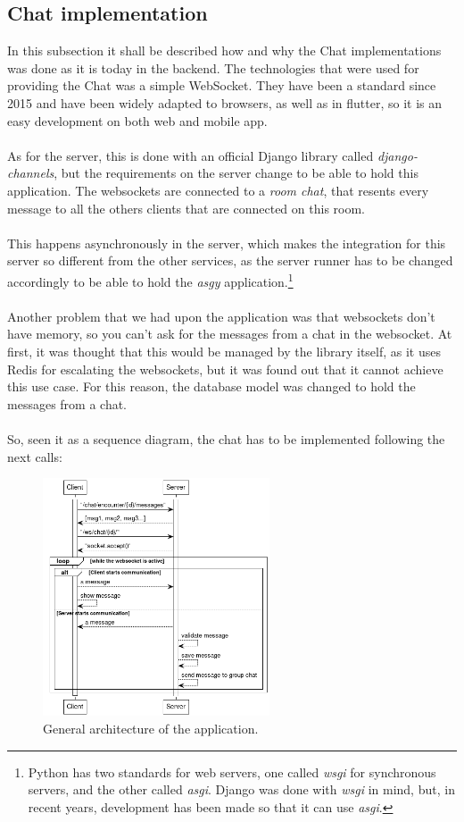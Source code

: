 \documentclass[./main.tex]{subfiles}
\begin{document}
	 \subsection{Chat implementation}
	 In this subsection it shall be described how and why the Chat implementations was done as it
	 is today in the backend. The technologies that were used for providing the Chat was a simple 
	 WebSocket. They have been a standard since 2015 and have been widely adapted to browsers,
	 as well as in flutter, so it is an easy development on both web and mobile app. \\
	 \\
	 As for the server, this is done with an official Django library called \textit{django-channels}, but the requirements on the server change to be able to hold this application. The websockets are connected to a \textit{room chat}, that resents every message to all the others clients that are connected on this room.\\
	 \\
	 This happens asynchronously in the server, which makes the integration for this server so different from the other services, as the server runner has to be changed accordingly to be able to hold the  \textit{asgy} application.\footnote{Python has two standards for web servers, one called \textit{wsgi} for  synchronous servers, and the other called \textit{asgi}. Django was done with \textit{wsgi} in mind, but,  in recent years, development has been made so that it can use \textit{asgi}.}
	 \\
	 \\
	 Another problem that we had upon the application was that websockets don't have memory, so you can't ask for the messages from a chat in the websocket. At first, it was thought  that this would be managed by the library itself, as it uses Redis for escalating the websockets, but it was found out that it cannot achieve this use case. For this reason, the database model was changed to hold the messages from a chat.\\
	 \\
	 So, seen it as a sequence diagram, the chat has to be implemented following the next calls:
 \begin{figure}[H]
 	\centering
 	\includegraphics[width=0.6\textwidth]{img/api-calls.png}
 	\caption{General architecture of the application.}
 \end{figure}
	 
\end{document}
